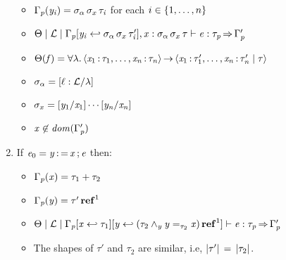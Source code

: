 \begin{lemma}[Inversion]
\begin{enumerate}
    \begin{itemize}
    \item $\Gamma_{\mathit{p}}  (  \mathit{y_{\mathit{i}}}  )  =  \sigma_{\alpha} \, \sigma_{x} \, \tau_{\mathit{i}}$ for each $i \in \left\{{1,\ldots,n}\right\}$
    \item $ \Theta   \mid   \mathcal{L}   \mid   \Gamma_{\mathit{p}}  [  \mathit{y_{\mathit{i}}}  \hookleftarrow  \sigma_{\alpha} \, \sigma_{x} \, \tau'_{\mathit{i}}  ]  ,  \mathit{x}  :  \sigma_{\alpha} \, \sigma_{x} \, \tau   \vdash   \mathit{e}  :  \tau_{\mathit{p}}   \operatorname{\Rightarrow}   \Gamma'_{\mathit{p}} $
    \item $\Theta  (  \mathit{f}  )  =   \forall  \lambda .\left\langle{ \mathit{x_{{\mathrm{1}}}} \operatorname{:}\tau_{{\mathrm{1}}} ,\dots, \mathit{x_{\mathit{n}}} \operatorname{:}\tau_{\mathit{n}} }\right\rangle\operatorname{\rightarrow}\left\langle{ \mathit{x_{{\mathrm{1}}}} \operatorname{:}\tau'_{{\mathrm{1}}} ,\dots, \mathit{x_{\mathit{n}}} \operatorname{:}\tau'_{\mathit{n}}  \mid  \tau }\right\rangle $
    \item $\sigma_{\alpha}  =  [  \ell  :  \mathcal{L}  /  \lambda  ]$
    \item $\sigma_{x}  =    [  \mathit{y_{{\mathrm{1}}}}  /  \mathit{x_{{\mathrm{1}}}}  ]  \cdots  [  \mathit{y_{\mathit{n}}}  /  \mathit{x_{\mathit{n}}}  ]  $
    \item $ \mathit{x}  \not\in   \mathit{dom}( \Gamma'_{\mathit{p}} )  $
    \end{itemize}
  \item If $\mathit{e_{{\mathrm{0}}}}  =   \mathit{y}  \operatorname{:=}  \mathit{x}  \operatorname{;}  \mathit{e} $ then:
    \begin{itemize}
    \item $\Gamma_{\mathit{p}}  (  \mathit{x}  )  =  \tau_{{\mathrm{1}}}  +  \tau_{{\mathrm{2}}}$
    \item $\Gamma_{\mathit{p}}  (  \mathit{y}  )  =   \tau'  \operatorname{\mathbf{ref}}^{ 1 } $
    \item $ \Theta   \mid   \mathcal{L}   \mid   \Gamma_{\mathit{p}}  [  \mathit{x}  \hookleftarrow  \tau_{{\mathrm{1}}}  ]  [  \mathit{y}  \hookleftarrow   (   \tau_{{\mathrm{2}}}  \wedge_{ \mathit{y} }   \mathit{y}  =_{ \tau_{{\mathrm{2}}} }  \mathit{x}    )  \operatorname{\mathbf{ref}}^{ 1 }   ]   \vdash   \mathit{e}  :  \tau_{\mathit{p}}   \operatorname{\Rightarrow}   \Gamma'_{\mathit{p}} $
    \item The shapes of $\tau'$ and $\tau_{{\mathrm{2}}}$ are similar, i.e, $ | \tau' |  \, = \,  | \tau_{{\mathrm{2}}} | $.

\end{itemize}
\end{enumerate}
\end{lemma}

